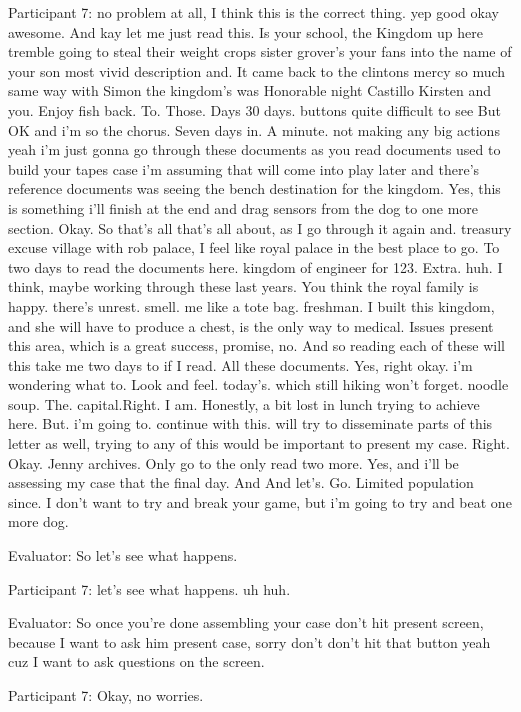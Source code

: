 \documentclass{l4proj}
\begin{document}
\begin{appendices}
Participant 7: no problem at all, I think this is the correct thing. yep good okay awesome. And kay let me just read this. Is your school, the Kingdom up here tremble going to steal their weight crops sister grover's your fans into the name of your son most vivid description and. It came back to the clintons mercy so much same way with Simon the kingdom's was Honorable night Castillo Kirsten and you. Enjoy fish back. To. Those. Days 30 days. buttons quite difficult to see But OK and i'm so the chorus. Seven days in. A minute. not making any big actions yeah i'm just gonna go through these documents as you read documents used to build your tapes case i'm assuming that will come into play later and there's reference documents was seeing the bench destination for the kingdom. Yes, this is something i'll finish at the end and drag sensors from the dog to one more section. Okay. So that's all that's all about, as I go through it again and. treasury excuse village with rob palace, I feel like royal palace in the best place to go. To two days to read the documents here. kingdom of engineer for 123. Extra. huh. I think, maybe working through these last years. You think the royal family is happy. there's unrest. smell. me like a tote bag. freshman. I built this kingdom, and she will have to produce a chest, is the only way to medical. Issues present this area, which is a great success, promise, no. And so reading each of these will this take me two days to if I read. All these documents. Yes, right okay. i'm wondering what to. Look and feel. today's. which still hiking won't forget. noodle soup. The. capital.Right. I am.
 Honestly, a bit lost in lunch trying to achieve here. But. i'm going to. continue with this. will try to disseminate parts of this letter as well, trying to any of this would be important to present my case. Right. Okay.  Jenny archives. Only go to the only read two more. Yes, and i'll be assessing my case that the final day. And And let's. Go. Limited population since. I don't want to try and break your game, but i'm going to try and beat one more dog.

Evaluator: So let's see what happens.

Participant 7: let's see what happens. uh huh.

Evaluator: So once you're done assembling your case don't hit present screen, because I want to ask him present case, sorry don't don't hit that button yeah cuz I want to ask questions on the screen.

Participant 7: Okay, no worries.


\end{appendices}
\end{document}
